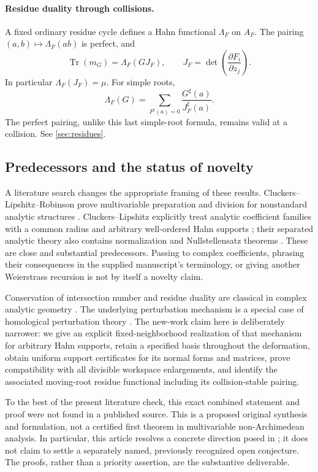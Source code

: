 \documentclass[11pt]{article}
\theoremstyle{definition}
\newcommand{\Tr}{\operatorname{Tr}}
\newcommand{\sh}{^{\sharp}}
\begin{document}
\paragraph{Residue duality through collisions.}
A fixed ordinary residue cycle defines a Hahn functional $\Lambda_F$ on $A_F$. The pairing $(a,b)\mapsto\Lambda_F(ab)$ is perfect, and
\begin{equation}\label{eq:introtrace}
 \Tr(m_G)=\Lambda_F(GJ_F),\qquad
 J_F=\det\left(\frac{\partial F_i}{\partial z_j}\right).
\end{equation}
In particular $\Lambda_F(J_F)=\mu$. For simple roots,
\[
 \Lambda_F(G)=\sum_{F\sh(a)=0}\frac{G\sh(a)}{J_F\sh(a)}.
\]
The perfect pairing, unlike this last simple-root formula, remains valid at a collision. See \cref{sec:residues}.

\subsection{Predecessors and the status of novelty}\label{sec:novelty}
A literature search changes the appropriate framing of these results. Cluckers--Lipshitz--Robinson prove multivariable preparation and division for nonstandard analytic structures \cite[Theorem 2.5 and Remark 2.6]{CLR}. Cluckers--Lipshitz explicitly treat analytic coefficient families with a common radius and arbitrary well-ordered Hahn supports \cite[\S3.1, Remark 3.1.4, Example 3.3(6)]{CL}; their separated analytic theory also contains normalization and Nullstellensatz theorems \cite[\S5.2]{CL}. These are close and substantial predecessors. Passing to complex coefficients, phrasing their consequences in the supplied manuscript's terminology, or giving another Weierstrass recursion is not by itself a novelty claim.

Conservation of intersection number and residue duality are classical in complex analytic geometry \cite{GR,GH,SS}. The underlying perturbation mechanism is a special case of homological perturbation theory \cite{Crainic}. The new-work claim here is deliberately narrower: we give an explicit fixed-neighborhood realization of that mechanism for arbitrary Hahn supports, retain a specified basis throughout the deformation, obtain uniform support certificates for its normal forms and matrices, prove compatibility with all divisible workspace enlargements, and identify the associated moving-root residue functional including its collision-stable pairing.

To the best of the present literature check, this exact combined statement and proof were not found in a published source. This is a proposed original synthesis and formulation, not a certified first theorem in multivariable non-Archimedean analysis. In particular, this article resolves a concrete direction posed in \cite{Source}; it does not claim to settle a separately named, previously recognized open conjecture. The proofs, rather than a priority assertion, are the substantive deliverable.
\end{document}
